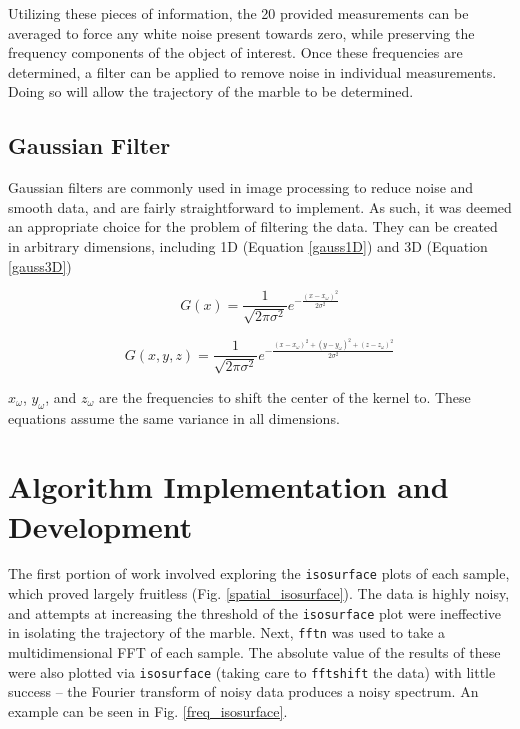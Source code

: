 \documentclass[journal]{IEEEtran}
\def\code#1{\texttt{#1}}
\begin{document}
Utilizing these pieces of information, the 20 provided measurements can be averaged to force any white noise present towards zero, while preserving the frequency components of the object of interest. Once these frequencies are determined, a filter can be applied to remove noise in individual measurements. Doing so will allow the trajectory of the marble to be determined.

\subsection{Gaussian Filter}
Gaussian filters are commonly used in image processing to reduce noise and smooth data, and are fairly straightforward to implement. As such, it was deemed an appropriate choice for the problem of filtering the data. They can be created in arbitrary dimensions, including 1D (Equation \ref{gauss1D}) and 3D (Equation \ref{gauss3D})

\begin{equation}
\label{gauss1D}
G(x)=\frac{1}{\sqrt{2\pi\sigma^2}}e^{-\frac{(x-x_{\omega})^2}{2\sigma^2}}
\end{equation}

\begin{equation}
\label{gauss3D}
G(x,y,z)=\frac{1}{\sqrt{2\pi\sigma^2}}e^{-\frac{(x-x_{\omega})^2+(y-y_{\omega})^2+(z-z_{\omega})^2}{2\sigma^2}}
\end{equation}

$x_{\omega}$, $y_{\omega}$, and $z_{\omega}$ are the frequencies to shift the center of the kernel to. These equations assume the same variance in all dimensions.

\section{Algorithm Implementation and Development}
The first portion of work involved exploring the \code{isosurface} plots of each sample, which proved largely fruitless (Fig. \ref{spatial_isosurface}). The data is highly noisy, and attempts at increasing the threshold of the \code{isosurface} plot were ineffective in isolating the trajectory of the marble. Next, \code{fftn} was used to take a multidimensional FFT of each sample. The absolute value of the results of these were also plotted via \code{isosurface} (taking care to \code{fftshift} the data) with little success -- the Fourier transform of noisy data produces a noisy spectrum. An example can be seen in Fig. \ref{freq_isosurface}. 
\end{document}
